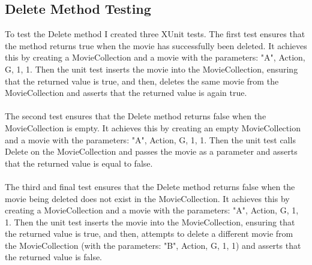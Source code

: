 \documentclass[12pt,a4paper]{article}
\begin{document}
		\subsection{Delete Method Testing}
			To test the Delete method I created three XUnit tests. The first test 
			ensures that the method returns true when the movie has successfully 
			been deleted. It achieves this by creating a MovieCollection and a 
			movie with the parameters: "A", Action, G, 1, 1. Then the unit test 
			inserts the movie into the MovieCollection, ensuring that the returned 
			value is true, and then, deletes the same movie from the MovieCollection 
			and asserts that the returned value is again true.\\
			\\
			The second test ensures that the Delete method returns false when the 
			MovieCollection is empty. It achieves this by creating an empty 
			MovieCollection and a movie with the parameters: "A", Action, G, 1, 1. 
			Then the unit test calls Delete on the MovieCollection and passes the 
			movie as a parameter and asserts that the returned value is equal to 
			false.\\
			\\
			The third and final test ensures that the Delete method returns false 
			when the movie being deleted does not exist in the MovieCollection. 
			It achieves this by creating a MovieCollection and a movie with the 
			parameters: "A", Action, G, 1, 1. Then the unit test inserts the movie 
			into the MovieCollection, ensuring that the returned value is true, 
			and then, attempts to delete a different movie from the MovieCollection 
			(with the parameters: "B", Action, G, 1, 1) and asserts that the returned 
			value is false.\\
\end{document}
